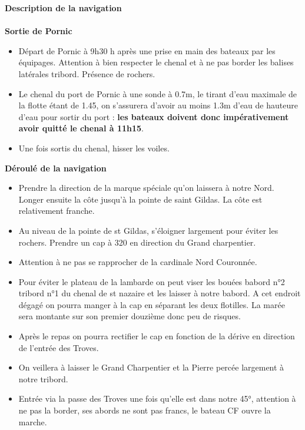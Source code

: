 \begin{minipage}[c][\textheight][t]{0.10\textwidth}
\hfill
\end{minipage}%
\begin{minipage}[c][\textheight][t]{0.50\textwidth}
    \vspace{2.5cm}
    \color{StrongBlue}    
    {\huge \textbf{Description de la navigation}}\\
            \vspace{0.1cm}\\
            {\large \textbf{Sortie de Pornic}}\\
            \begin{itemize}
                \itemsep0em 
                \item Départ de Pornic à 9h30 h après une prise en main des bateaux par les équipages. Attention à bien respecter le chenal et à ne pas border les balises latérales tribord. Présence de rochers.
                \item Le chenal du port de Pornic à une sonde à 0.7m, le tirant d'eau maximale de la flotte étant de 1.45, on s'assurera d'avoir au moins 1.3m d'eau de hauteure d'eau pour sortir du port : \textbf{les bateaux doivent donc impérativement avoir quitté le chenal à 11h15}. 
                \item Une fois sortis du chenal, hisser les voiles.

            \end{itemize}
            {\large \textbf{Déroulé de la navigation}}\\
            \begin{itemize}
                \itemsep0em 
                \item Prendre la direction de la marque spéciale qu'on laissera à notre Nord. Longer ensuite la côte jusqu'à la pointe de saint Gildas. La côte est relativement franche. 
                \item Au niveau de la pointe de st Gildas, s'éloigner largement pour éviter les rochers. Prendre un cap à 320 en direction du Grand charpentier. 
                \item Attention à ne pas se rapprocher de la cardinale Nord Couronnée.
                \item Pour éviter le plateau de la lambarde on peut viser les bouées babord n°2 tribord n°1 du chenal de st nazaire et les laisser à notre babord. A cet endroit dégagé on pourra manger à la cap en séparant les deux flotilles. La marée sera montante sur son premier douzième donc peu de risques. 
                \item Après le repas on pourra rectifier le cap en fonction de la dérive en direction de l'entrée des Troves.
                \item On veillera à laisser le Grand Charpentier et la Pierre percée largement à notre tribord. 
                \item Entrée via la passe des Troves une fois qu'elle est dans notre 45°, attention à ne pas la border, ses abords ne sont pas francs, le bateau CF ouvre la marche. 
            \end{itemize}
        

\end{minipage}
